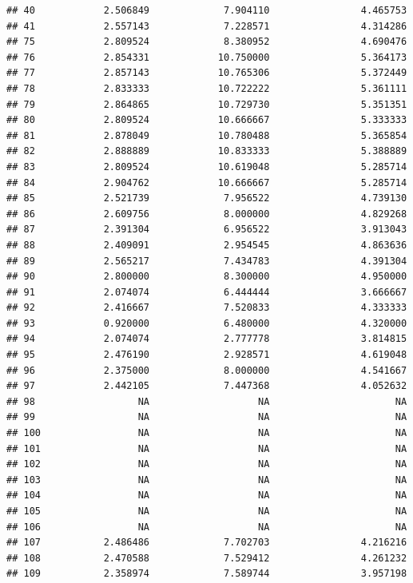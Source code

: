 \documentclass[]{article}
\begin{document}
\begin{verbatim}
## 40            2.506849             7.904110                4.465753
## 41            2.557143             7.228571                4.314286
## 75            2.809524             8.380952                4.690476
## 76            2.854331            10.750000                5.364173
## 77            2.857143            10.765306                5.372449
## 78            2.833333            10.722222                5.361111
## 79            2.864865            10.729730                5.351351
## 80            2.809524            10.666667                5.333333
## 81            2.878049            10.780488                5.365854
## 82            2.888889            10.833333                5.388889
## 83            2.809524            10.619048                5.285714
## 84            2.904762            10.666667                5.285714
## 85            2.521739             7.956522                4.739130
## 86            2.609756             8.000000                4.829268
## 87            2.391304             6.956522                3.913043
## 88            2.409091             2.954545                4.863636
## 89            2.565217             7.434783                4.391304
## 90            2.800000             8.300000                4.950000
## 91            2.074074             6.444444                3.666667
## 92            2.416667             7.520833                4.333333
## 93            0.920000             6.480000                4.320000
## 94            2.074074             2.777778                3.814815
## 95            2.476190             2.928571                4.619048
## 96            2.375000             8.000000                4.541667
## 97            2.442105             7.447368                4.052632
## 98                  NA                   NA                      NA
## 99                  NA                   NA                      NA
## 100                 NA                   NA                      NA
## 101                 NA                   NA                      NA
## 102                 NA                   NA                      NA
## 103                 NA                   NA                      NA
## 104                 NA                   NA                      NA
## 105                 NA                   NA                      NA
## 106                 NA                   NA                      NA
## 107           2.486486             7.702703                4.216216
## 108           2.470588             7.529412                4.261232
## 109           2.358974             7.589744                3.957198

\end{verbatim}
\end{document}
